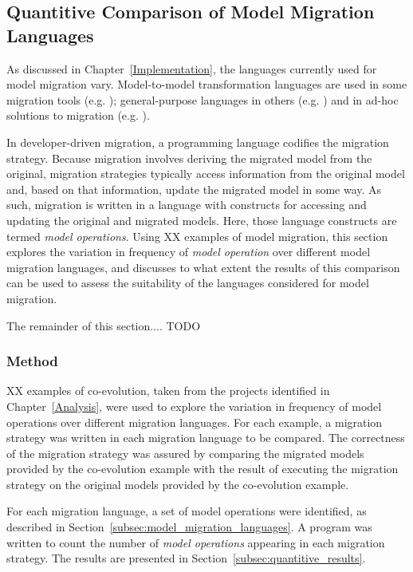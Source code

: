
\subsection{Quantitive Comparison of Model Migration Languages}
As discussed in Chapter~\ref{Implementation}, the languages currently used for model migration vary. Model-to-model transformation languages are used in some migration tools (e.g. \cite{cicchetti,garces}); general-purpose languages in others (e.g. \cite{ecore2ecore,cope}) and in ad-hoc solutions to migration (e.g. \cite{gmf}).

In developer-driven migration, a programming language codifies the migration strategy. Because migration involves deriving the migrated model from the original, migration strategies typically access information from the original model and, based on that information, update the migrated model in some way. As such, migration is written in a language with constructs for accessing and updating the original and migrated models. Here, those language constructs are termed \textit{model operations}. Using XX examples of model migration, this section explores the variation in frequency of \emph{model operation} over different model migration languages, and discusses to what extent the results of this comparison can be used to assess the suitability of the languages considered for model migration.

The remainder of this section.... TODO


\subsubsection{Method}
XX examples of co-evolution, taken from the projects identified in Chapter~\ref{Analysis}, were used to explore the variation in frequency of model operations over different migration languages. For each example, a migration strategy was written in each migration language to be compared. The correctness of the migration strategy was assured by comparing the migrated models provided by the co-evolution example with the result of executing the migration strategy on the original models provided by the co-evolution example.

For each migration language, a set of model operations were identified, as described in Section~\ref{subsec:model_migration_languages}. A program was written to count the number of \emph{model operations} appearing in each migration strategy. The results are presented in Section~\ref{subsec:quantitive_results}.

